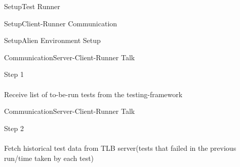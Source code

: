 \documentclass{beamer}
\begin{document}
\begin{frame}{Setup}{Test Runner}
  \begin{centering}
  \end{centering}
\end{frame}

\begin{frame}{Setup}{Client-Runner Communication}
  \begin{centering}
  \end{centering}
\end{frame}

\begin{frame}{Setup}{Alien Environment Setup}
  \begin{centering}
  \end{centering}
\end{frame}

\begin{frame}{Communication}{Server-Client-Runner Talk}
  \begin{multicols}{2}
    \begin{centering}
    \end{centering}
    \begin{center}
      {\huge Step 1}\\
      \quad\\
          {\large Receive list of to-be-run tests from the testing-framework}
    \end{center}
  \end{multicols}
\end{frame}

\begin{frame}{Communication}{Server-Client-Runner Talk}
  \begin{multicols}{2}
    \begin{centering}
    \end{centering}
    \begin{center}
      {\huge Step 2}\\
      \quad\\
          {\large Fetch historical test data from TLB server(tests that failed in the previous run/time taken by each test)}
    \end{center}
  \end{multicols}
\end{frame}
\end{document}
